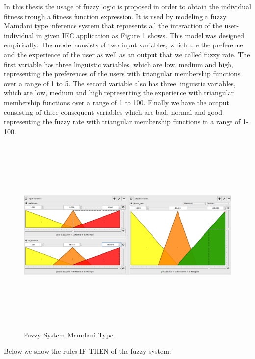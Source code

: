 In this thesis the usage of fuzzy logic is proposed \cite{Zadeh1973} in order to
obtain the individual fitness trough a fitness function expression. It is used
by modeling a fuzzy Mamdani type inference system \cite{mamdani1975experiment}
\cite{mamdani1974application} that represents all the interaction of the
user-individual in given IEC application as Figure \ref{fig:fis01} shows. This
model was designed empirically. The model consists of two input variables, which
are the preference and the experience of the user as well as an output that we
called fuzzy rate. The first variable has three linguistic variables, which are
low, medium and high, representing the preferences of the users with triangular
membership functions over a range of 1 to 5. The second variable also has three
linguistic variables, which are low, medium and high representing the experience
with triangular membership functions over a range of 1 to 100. Finally we have
the output consisting of three consequent variables which are bad, normal and
good representing the fuzzy rate with triangular membership functions in a range
of 1-100.

\begin{figure}
\captionsetup{justification=centering,margin=2cm}
\centering
\setlength\fboxsep{0pt}
\setlength\fboxrule{0.7pt}
\includegraphics[width=12cm,height=10cm,keepaspectratio]{img/fuzzy_system_2_1.png}
\caption{Fuzzy System Mamdani Type.}
\label{fig:fis01}
\end{figure}

Below we show the rules IF-THEN of the fuzzy system:

